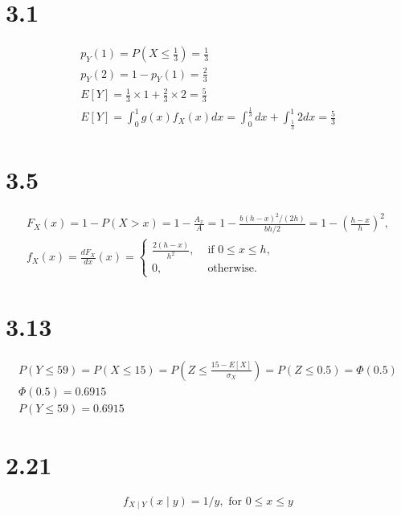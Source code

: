 \documentclass{article}
\begin{document}
		
	\section*{3.1}
		$$
		\begin{gathered}
		p_{Y}(1)=P(X \leq \frac{1}{3})=\frac{1}{3} \\
		p_{Y}(2)=1-p_{Y}(1)=\frac{2}{3} \\
		E[Y]=\frac{1}{3} \times 1+\frac{2}{3} \times 2=\frac{5}{3} \\
		E[Y]=\int_{0}^{1} g(x) f_{X}(x) d x=\int_{0}^{\frac{1}{3}} d x+\int_{\frac{1}{3}}^{1} 2 d x=\frac{5}{3}
		\end{gathered}
		$$
	\section*{3.5}
		$$
		\begin{gathered}
		F_{X}(x)=1-P(X>x)=1-\frac{A_{x}}{A}=1-\frac{b(h-x)^{2} /(2 h)}{b h / 2}=1-\left(\frac{h-x}{h}\right)^{2}, \\
		f_{X}(x)=\frac{d F_{X}}{d x}(x)= \begin{cases}\frac{2(h-x)}{h^{2}}, & \text { if } 0 \leq x \leq h, \\
		0, & \text { otherwise. }\end{cases}
		\end{gathered}
		$$

	
	\section*{3.13}
	
		$$
		\begin{gathered}
		P(Y \leq 59)=P(X \leq 15)=P\left(Z \leq \frac{15-E[X]}{\sigma_{X}}\right)=P(Z \leq 0.5)=\Phi(0.5) \\
		\Phi(0.5)=0.6915 \\
		P(Y \leq 59)=0.6915
		\end{gathered}
		$$

	\section*{2.21}
		\begin{equation}
		f_{X \mid Y}(x \mid y)=1 / y, \text { for } 0 \leq x \leq y
		\end{equation}
\end{document}
